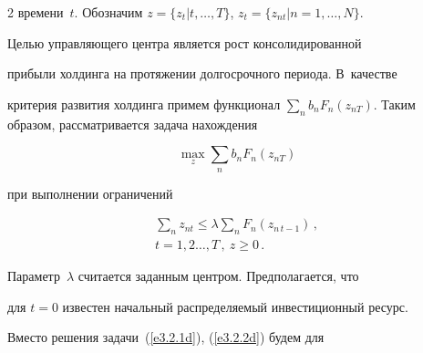 \begin{multicols}{2}
времени~$t$. Обозначим $z=\{ z_t\vert t, \ldots , T\}$, $z_t=\{z_{nt}\vert 


n=1,\ldots ,N\}$.


     


     Целью управляющего центра является рост консолидированной 


прибыли холдинга на протяжении долгосрочного периода. В~качестве 


критерия развития холдинга примем функционал $\sum\limits_n b_n 


F_n(z_{nT})$. Таким образом, рассматривается задача нахождения 





\noindent


     \begin{equation}


     \underset{z}{\max} \sum\limits_n b_n F_n(z_{nT})


     \label{e3.2.1d}


     \end{equation}


при выполнении ограничений





\vspace*{-6pt}





\noindent


\begin{multline}


\sum\limits_n z_{nt}\leq \lambda \sum\limits_n F_n(z_{n\,t-1})\,,\\[-6pt]


 t=1,2\ldots 


, T\,, \ z\geq 0\,.


\label{e3.2.2d}


\end{multline}


     


     Параметр~$\lambda$ считается заданным центром. Предполагается, что 


для $t=0$ известен начальный распределяемый инвестиционный ресурс. 


     


     Вместо решения задачи~(\ref{e3.2.1d}), (\ref{e3.2.2d}) будем для 



\end{multicols}
